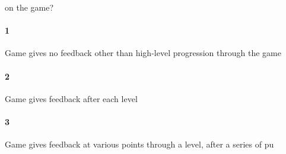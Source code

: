  on the game?\paragraph{1}Game gives no feedback other than high-level progression through the game\paragraph{2}Game gives feedback after each level\paragraph{3}Game gives feedback at various points through a level, after a series of pu